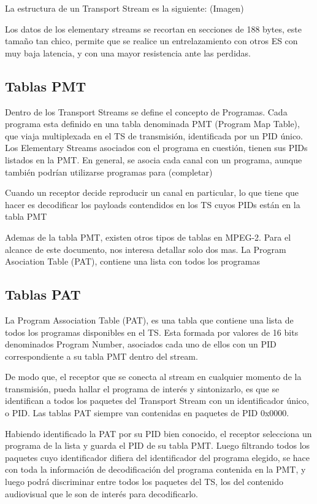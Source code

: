 	La estructura de un Transport Stream es la siguiente:
	(Imagen)
	
	Los datos de los elementary streams se recortan en secciones de 188 bytes, este tamaño tan chico, permite que se realice un entrelazamiento con otros ES con muy baja latencia, y con una mayor resistencia ante las perdidas.

	\subsection{Tablas PMT}

	Dentro de los Transport Streams se define el concepto de Programas. Cada programa esta definido en una tabla denominada PMT (Program Map Table), que viaja multiplexada en el TS de transmisión, identificada por un PID único. Los Elementary Streams asociados con el programa en cuestión, tienen sus PIDs listados en la PMT. En general, se asocia cada canal con un programa, aunque también podrían utilizarse programas para (completar)
	
	Cuando un receptor decide reproducir un canal en particular, lo que tiene que hacer es decodificar los payloads contendidos en los TS cuyos PIDs están en la tabla PMT
	
	Ademas de la tabla PMT, existen otros tipos de tablas en MPEG-2. Para el alcance de este documento, nos interesa detallar solo dos mas.
	La Program Asociation Table (PAT), contiene una lista con todos los programas 

	
	\subsection{Tablas PAT}
	La Program Association Table (PAT), es una tabla que contiene una lista de todos los programas disponibles en el TS. Esta formada por valores de 16 bits denominados Program Number, asociados cada uno de ellos con un PID correspondiente a su tabla PMT dentro del stream. 
	
	De modo que, el receptor que se conecta al stream en cualquier momento de la transmisión, pueda hallar el programa de interés y sintonizarlo, es que se identifican a todos los paquetes del Transport Stream con un identificador único, o PID. Las tablas PAT siempre van contenidas en paquetes de PID 0x0000.
	
	Habiendo identificado la PAT por su PID bien conocido, el receptor selecciona un programa de la lista y guarda el PID de su tabla PMT. Luego filtrando todos los paquetes cuyo identificador difiera del identificador del programa elegido, se hace con toda la información de decodificación del programa contenida en la PMT, y luego podrá discriminar entre todos los paquetes del TS, los del contenido audiovisual que le son de interés para decodificarlo. 
 
